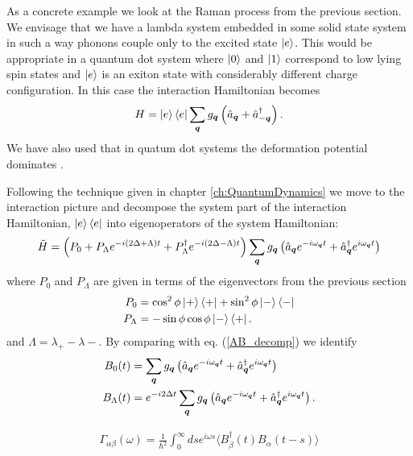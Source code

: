 As a concrete example we look at the Raman process from the previous section. We envisage that we have a lambda system embedded in some solid state system in such a way phonons couple only to the excited state $\left\vert e\right\rangle$. This would be appropriate in a quantum dot system where $\left\vert0\right\rangle$ and $\left\vert1\right\rangle$ correspond to low lying spin states and $\left\vert e\right\rangle$ is an exiton state with considerably different charge configuration. In this case the interaction Hamiltonian becomes
\begin{align}
  H = \left\vert e\right\rangle\left\langle e\right\vert\sum_{{\boldsymbol{q}}} g_{{\boldsymbol{q}}}\left(\hat{a}_{{\boldsymbol{q}}} + \hat{a}^\dagger_{-{\boldsymbol{q}}}\right).
\end{align}
We have also used that in quatum dot systems the deformation potential dominates \cite{gardiner+zoller, pazy}.

Following the technique given in chapter \ref{ch:QuantumDynamics} we move to the interaction picture and decompose the system part of the interaction Hamiltonian, $\left\vert e\right\rangle\left\langle e\right\vert$ into eigenoperators of the system Hamiltonian:
\begin{align}
  \tilde{H} = \left(P_0 + P_\Lambda e^{-i(2\Delta + \Lambda) t} + P^\dagger_\Lambda e^{-i(2\Delta - \Lambda) t}\right)\sum_{{\boldsymbol{q}}}g_{{\boldsymbol{q}}}\left(\hat{a}_{{\boldsymbol{q}}}e^{-i\omega_{{\boldsymbol{q}}} t} + \hat{a}^\dagger_{{\boldsymbol{q}}} e^{i\omega_{{\boldsymbol{q}}} t} \right)
\end{align}
where $P_0$ and $P_\Lambda$ are given in terms of the eigenvectors from the previous section
\begin{align}
  P_0 &= \cos^2\phi \left\vert+\right\rangle\left\langle +\right\vert + \sin^2\phi \left\vert-\right\rangle\left\langle -\right\vert \\
  P_\Lambda &= -\sin\phi \cos\phi \left\vert-\right\rangle\left\langle +\right\vert.
\end{align}
and $\Lambda = \lambda_{+} - \lambda{-}$. By comparing with eq. (\ref{AB_decomp}) we identify
\begin{align}
  B_0(t) &= \sum_{{\boldsymbol{q}}} g_{{\boldsymbol{q}}} \left(\hat{a}_{{\boldsymbol{q}}} e^{-i\omega_{{\boldsymbol{q}}} t} + \hat{a}^\dagger_{{\boldsymbol{q}}} e^{i\omega_{{\boldsymbol{q}}} t}\right) \\
  B_\Lambda(t) &= e^{-i2\Delta t}\sum_{{\boldsymbol{q}}} g_{{\boldsymbol{q}}} \left(\hat{a}_{{\boldsymbol{q}}} e^{-i\omega_{{\boldsymbol{q}}} t} + \hat{a}^\dagger_{{\boldsymbol{q}}} e^{i\omega_{{\boldsymbol{q}}} t}\right).
\end{align}

\begin{align}
  \Gamma_{\alpha\beta}(\omega) = \frac{1}{\hbar^2}\int_0^\infty ds e^{i\omega s}\langle B^\dagger_\beta(t) B_\alpha(t-s)\rangle
\end{align}

